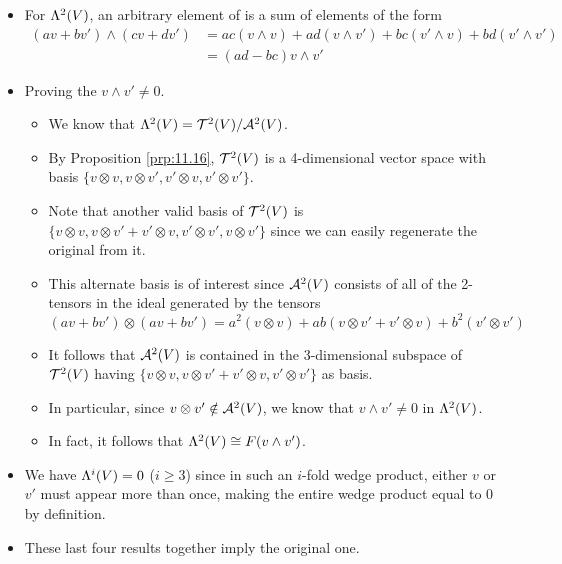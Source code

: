 \documentclass[../notes.tex]{subfiles}
\begin{document}
\begin{itemize}
\begin{enumerate}
\begin{itemize}
            \item For $\lam[2]{V}$, an arbitrary element of is a sum of elements of the form
            \begin{align*}
                (av+bv')\wedge(cv+dv') &= ac(v\wedge v)+ad(v\wedge v')+bc(v'\wedge v)+bd(v'\wedge v')\\
                &= (ad-bc)v\wedge v'
            \end{align*}
            \item Proving the $v\wedge v'\neq 0$.
            \begin{itemize}
                \item We know that $\lam[2]{V}=\ten[2]{V}/\alt[2]{V}$.
                \item By Proposition \ref{prp:11.16}, $\ten[2]{V}$ is a 4-dimensional vector space with basis $\{v\otimes v,v\otimes v',v'\otimes v,v'\otimes v'\}$.
                \item Note that another valid basis of $\ten[2]{V}$ is $\{v\otimes v,v\otimes v'+v'\otimes v,v'\otimes v',v\otimes v'\}$ since we can easily regenerate the original from it.
                \item This alternate basis is of interest since $\alt[2]{V}$ consists of all of the 2-tensors in the ideal generated by the tensors
                \begin{equation*}
                    (av+bv')\otimes(av+bv') = a^2(v\otimes v)+ab(v\otimes v'+v'\otimes v)+b^2(v'\otimes v')
                \end{equation*}
                \item It follows that $\alt[2]{V}$ is contained in the 3-dimensional subspace of $\ten[2]{V}$ having $\{v\otimes v,v\otimes v'+v'\otimes v,v'\otimes v'\}$ as basis.
                \item In particular, since $v\otimes v'\notin\alt[2]{V}$, we know that $v\wedge v'\neq 0$ in $\lam[2]{V}$.
                \item In fact, it follows that $\lam[2]{V}\cong F(v\wedge v')$.
            \end{itemize}
            \item We have $\lam[i]{V}=0$ ($i\geq 3$) since in such an $i$-fold wedge product, either $v$ or $v'$ must appear more than once, making the entire wedge product equal to 0 by definition.
            \item These last four results together imply the original one.
        \end{itemize}
    \end{enumerate}

\end{itemize}
\end{document}
